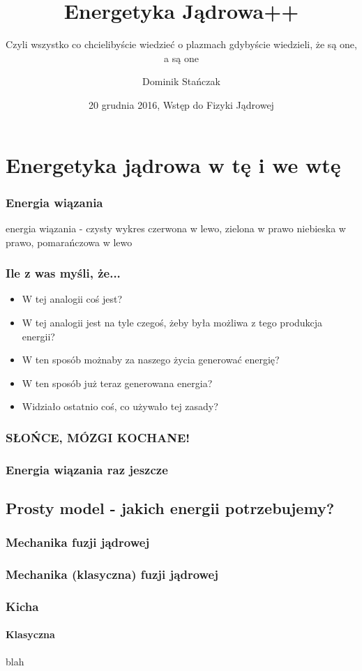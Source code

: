 \documentclass{beamer}
\title[Fizyka plazmy]{Energetyka Jądrowa++}
\subtitle{Czyli wszystko co chcielibyście wiedzieć o plazmach gdybyście
wiedzieli, że są one, a są one}
\institute{Politechnika Warszawska}
\author{Dominik Stańczak}
\date{20 grudnia 2016, Wstęp do Fizyki Jądrowej}
\begin{document}
  \frame{\titlepage}

  \section{Energetyka jądrowa w tę i we wtę}
  \begin{frame}
    \frametitle{Energia wiązania}
    energia wiązania - czysty wykres
    \pause
    czerwona w lewo, zielona w prawo
    \pause
    niebieska w prawo, pomarańczowa w lewo
  \end{frame}
  \begin{frame}
    \frametitle{Ile z was myśli, że...}
    \begin{itemize}[<+->]
      \item W tej analogii coś jest?
      \item W tej analogii jest na tyle czegoś, żeby była możliwa z tego produkcja energii?
      \item W ten sposób możnaby za naszego życia generować energię?
      \item W ten sposób już teraz generowana energia?
      \item Widziało ostatnio coś, co używało tej zasady?
    \end{itemize}
  \end{frame}
  \begin{frame}
    \frametitle{SŁOŃCE, MÓZGI KOCHANE!}
    \pause
  \end{frame}
  \begin{frame}
    \frametitle{Energia wiązania raz jeszcze}
  \end{frame}

  \subsection{Prosty model - jakich energii potrzebujemy?}
  \begin{frame}
    \frametitle{Mechanika fuzji jądrowej}
  \end{frame}

  \begin{frame}
    \frametitle{Mechanika (klasyczna) fuzji jądrowej}
  \end{frame}


  \begin{frame}
    \frametitle{Kicha}
    \framesubtitle{Klasyczna}
    blah
    \pause
  \end{frame}
\end{document}
